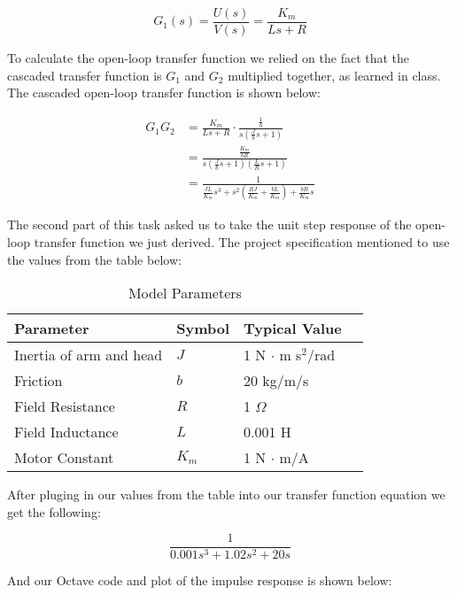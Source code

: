 \documentclass{article}
\newcommand{\matlab}[1]{%
%
}
\begin{document}
$$G_1(s) = \frac{U(s)}{V(s)} = \frac{K_m}{Ls + R}$$

To calculate the open-loop transfer function we relied on the fact
that the cascaded transfer function is $G_1$ and $G_2$ multiplied
together, as learned in class. The cascaded open-loop transfer
function is shown below:

\begin{align*}
  G_1G_2 &= \frac{K_m}{Ls+R} \cdot \frac{\frac{1}{b}}{s(\frac{J}{b}s + 1)} \\
         &= \frac{\frac{K_m}{bR}}{s\left(\frac{J}{b}s + 1\right)  
		 \left(\frac{L}{R}s + 1\right)} \\
         &= \frac{1}{\frac{JL}{K_m}s^3 + s^2\left( \frac{RJ}{K_m} + 
		 \frac{bL}{K_m} \right) + \frac{bR}{K_m}s}
\end{align*}

The second part of this task asked us to take the unit step response
of the open-loop transfer function we just derived. The project
specification mentioned to use the values from the table below:

\begin{table}[H]
  \begin{center}
    \begin{tabular}{ | l | l | l | p{5cm} |}
    \hline
    \textbf{Parameter} & \textbf{Symbol} & \textbf{Typical Value} \\ \hline
    Inertia of arm and head & $J$ & 1 N $\cdot$ m s$^2$/rad \\ \hline 
    Friction & $b$ & 20 kg/m/s \\ \hline
    Field Resistance & $R$ & 1 $\Omega$ \\ \hline
    Field Inductance & $L$ & 0.001 H \\ \hline
    Motor Constant & $K_m$ & 1 N $\cdot$ m/A \\ \hline
   \end{tabular}
 \end{center}
 \caption{Model Parameters}
\end{table}

After pluging in our values from the table into our transfer function
equation we get the following:

$$\frac{1}{0.001s^3 + 1.02 s^2 + 20s}$$

And our Octave code and plot of the impulse response is shown below:

\matlab{fig1.m}
\end{document}
